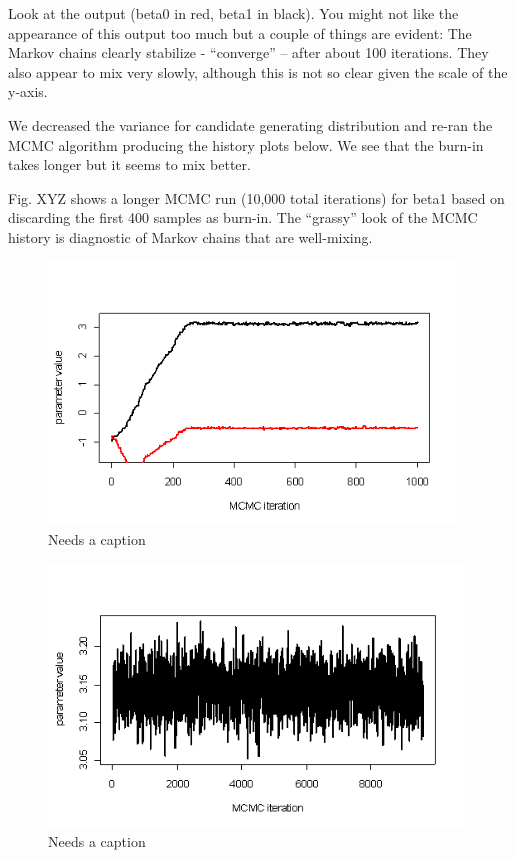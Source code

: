 Look at the output (beta0 in red, beta1 in black). You might not like the appearance of this output too much but a couple of things are evident: The Markov chains clearly stabilize - ``converge'' --  after about 100 iterations. They also appear to mix very slowly, although this is not so clear given the scale of the y-axis.
 

We decreased the variance for candidate generating distribution and
re-ran the MCMC algorithm producing the history plots below. We see
that the burn-in takes longer but it seems to mix better.


Fig. XYZ shows a longer MCMC run (10,000 total iterations) for beta1
based on discarding the first 400 samples as burn-in. The ``grassy''
look of the MCMC history is diagnostic of Markov chains that are
well-mixing.

\begin{figure}
\begin{center}
\includegraphics[height=2.75in]{figs/MCMC2}
\end{center}
\caption{Needs a caption}
\label{fig.MCMC2}
\end{figure}


\begin{figure}
\begin{center}
\includegraphics[height=2.75in]{figs/MCMC3}
\end{center}
\caption{Needs a caption}
\label{fig.MCMC3}
\end{figure}

